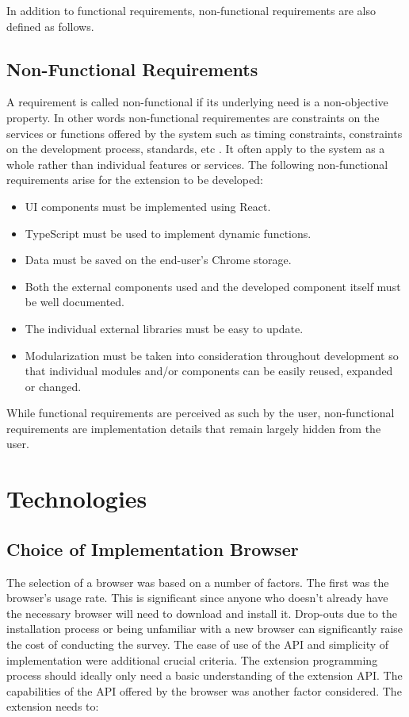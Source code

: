 In addition to functional requirements, non-functional requirements are also defined as follows.

\subsection{Non-Functional Requirements}
A requirement is called non-functional if its underlying need is a non-objective property. In other words non-functional requirementes are constraints on the services or functions offered by the system such as timing constraints, constraints on the development process, standards, etc \autocite{sommerville2011software}. It often apply to the system as a whole rather than individual features or services. The following non-functional requirements arise for the extension to be developed:

\begin{itemize}
  \item UI components must be implemented using React.
  \item TypeScript must be used to implement dynamic functions.
  \item Data must be saved on the end-user's Chrome storage.
  \item Both the external components used and the developed component itself must be well documented.
  \item The individual external libraries must be easy to update.
  \item Modularization must be taken into consideration throughout development so that individual modules and/or components can be easily reused, expanded or changed.
\end{itemize}

While functional requirements are perceived as such by the user, non-functional requirements are implementation details that remain largely hidden from the user.

\section{Technologies}
\label{technologies_used}

\subsection{Choice of Implementation Browser}
The selection of a browser was based on a number of factors. The first was the browser's usage rate. This is significant since anyone who doesn't already have the necessary browser will need to download and install it. Drop-outs due to the installation process or being unfamiliar with a new browser can significantly raise the cost of conducting the survey. The ease of use of the API and simplicity of implementation were additional crucial criteria. The extension programming process should ideally only need a basic understanding of the extension API. The capabilities of the API offered by the browser was another factor considered. The extension needs to:

